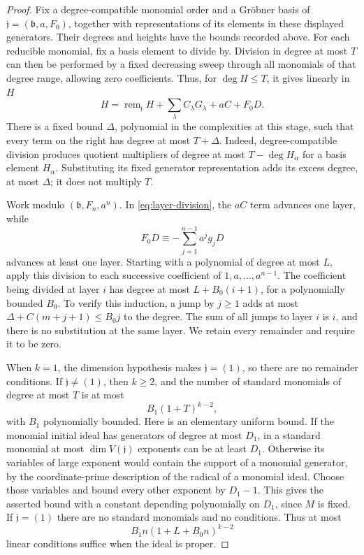 \begin{proof}
Fix a degree-compatible monomial order and a Gr\"obner basis of
$\mathfrak j=(\mathfrak b,a,F_0)$, together with representations of
its elements in these displayed generators.  Their degrees and heights
have the bounds recorded above.  For each reducible monomial, fix a
basis element to divide by.  Division in degree at most $T$ can then be
performed by a fixed decreasing sweep through all monomials of that
degree range, allowing zero coefficients.  Thus, for $\deg H\leq T$,
it gives linearly in $H$
\begin{equation}\label{eq:layer-division}
 H=\operatorname{rem}_{\mathfrak j}H
   +\sum_\lambda C_\lambda G_\lambda+aC+F_0D.
\end{equation}
There is a fixed bound $\Delta$, polynomial in the complexities at this
stage, such that every term on the right has degree at most $T+\Delta$.
Indeed, degree-compatible division produces quotient multipliers of
degree at most $T-\deg H_\alpha$ for a basis element $H_\alpha$.
Substituting its fixed generator representation adds its excess degree,
at most $\Delta$; it does not multiply $T$.

Work modulo $(\mathfrak b,F_n,a^n)$.  In
\eqref{eq:layer-division}, the $aC$ term advances one layer, while
\[
 F_0D\equiv-\sum_{j=1}^{n-1}a^jg_jD
\]
advances at least one layer.  Starting with a polynomial of degree at
most $L$, apply this division to each successive coefficient of
$1,a,\ldots,a^{n-1}$.  The coefficient being divided at layer $i$ has
degree at most $L+B_0(i+1)$, for a polynomially bounded $B_0$.
To verify this induction, a jump by $j\geq1$ adds at most
$\Delta+C(m+j+1)\leq B_0j$ to the degree.  The sum of all jumps to
layer $i$ is $i$, and there is no substitution at the same layer.
We retain every remainder and require it to be zero.

When $k=1$, the dimension hypothesis makes $\mathfrak j=(1)$, so there
are no remainder conditions.  If $\mathfrak j\ne(1)$, then $k\ge2$,
and the number of standard monomials of degree at most $T$ is at most
\[
 B_1(1+T)^{k-2},
\]
with $B_1$ polynomially bounded.  Here is an elementary uniform bound.
If the monomial initial ideal has generators of degree at most $D_1$,
in a standard monomial at most $\dim V(\mathfrak j)$ exponents can
be at least $D_1$.  Otherwise its variables of large exponent would
contain the support of a monomial generator, by the coordinate-prime
description of the radical of a monomial ideal.  Choose those variables
and bound every other exponent by $D_1-1$.  This gives the asserted
bound with a constant depending polynomially on $D_1$, since $M$ is
fixed.  If $\mathfrak j=(1)$ there are no standard monomials and no
conditions.  Thus at most
\begin{equation}\label{eq:layer-condition-count}
 B_1n(1+L+B_0n)^{k-2}
\end{equation}
linear conditions suffice when the ideal is proper.


\end{proof}

